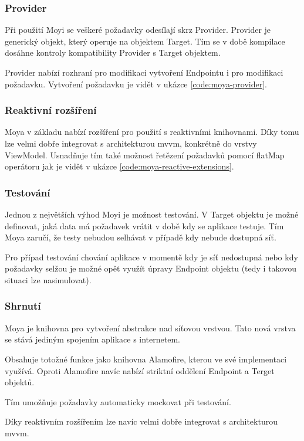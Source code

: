 \subsubsection*{Provider}

Při použití Moyi se veškeré požadavky odesílají skrz Provider.
Provider je generický objekt, který operuje na objektem Target.
Tím se v době kompilace dosáhne kontroly kompatibility Provider s Target objektem.

Provider nabízí rozhraní pro modifikaci vytvoření Endpointu i pro modifikaci požadavku.
Vytvoření požadavku je vidět v ukázce \ref{code:moya-provider}.


\subsubsection*{Reaktivní rozšíření}

Moya v základu nabízí rozšíření pro použití s reaktivními knihovnami.
Díky tomu lze velmi dobře integrovat s architekturou \acrshort{mvvm}, konkrétně do vrstvy ViewModel.
Usnadňuje tím také možnost řetězení požadavků pomocí flatMap operátoru jak je vidět v ukázce \ref{code:moya-reactive-extensions}.


\subsubsection*{Testování}

Jednou z největších výhod Moyi je možnost testování.
V Target objektu je možné definovat, jaká data má požadavek vrátit v době kdy se aplikace testuje.
Tím Moya zaručí, že testy nebudou selhávat v případě kdy nebude dostupná síť.

Pro případ testování chování aplikace v momentě kdy je síť nedostupná nebo kdy požadavky selžou je možné opět využít úpravy Endpoint objektu (tedy i takovou situaci lze nasimulovat).

\subsubsection*{Shrnutí}

Moya je knihovna pro vytvoření abstrakce nad síťovou vrstvou.
Tato nová vrstva se stává jediným spojením aplikace s internetem.

Obsahuje totožné funkce jako knihovna Alamofire, kterou ve své implementaci využívá.
Oproti Alamofire navíc nabízí striktní oddělení Endpoint a Terget objektů.

Tím umožňuje požadavky automaticky mockovat při testování.

Díky reaktivním rozšířením lze navíc velmi dobře integrovat s architekturou \acrshort{mvvm}.